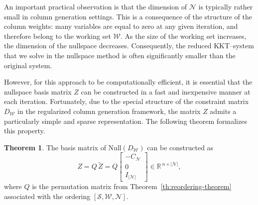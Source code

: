 \documentclass{book}
\theoremstyle{definition}
\newtheorem{theorem}{Theorem}[section]
\numberwithin{algorithm_}{chapter}
\begin{document}
{An important practical observation is that the dimension of $\mathcal{N}$ is typically rather small in column generation settings. This is a consequence of the structure of the column weights: many variables are equal to zero at any given iteration, and therefore belong to the working set \(\mathcal{W}\). As the size of the working set increases, the dimension of the nullspace decreases. Consequently, the reduced KKT--system that we solve in the nullspace method is often significantly smaller than the original system.

\bigskip

However, for this approach to be computationally efficient, it is essential that the nullspace basis matrix \(Z\) can be constructed in a fast and inexpensive manner at each iteration. Fortunately, due to the special structure of the constraint matrix \(D_{\mathcal{W}}\) in the regularized column generation framework, the matrix \(Z\) admits a particularly simple and sparse representation. The following theorem formalizes this property.


\begin{theorem} \label{th:nullspace-basis}
The basis matrix of $\mathrm{Null}(D_\mathcal{W})$ can be constructed as
\begin{equation} \label{eq:nullspace_basis}
    Z = Q \, \tilde{Z}
    = 
    Q
    \begin{bmatrix}
        - C_\mathcal{N} \\[0.3em]
        0 \\[0.3em]
        I_{|\mathcal{N}|}
    \end{bmatrix}
    \in \mathbb{R}^{\,n \times |\mathcal{N}|},
\end{equation}
where $Q$ is the permutation matrix from Theorem~\ref{th:reordering-theorem} associated with the ordering $[\mathcal{S},\mathcal{W},\mathcal{N}]$.


\end{theorem}}
\end{document}
